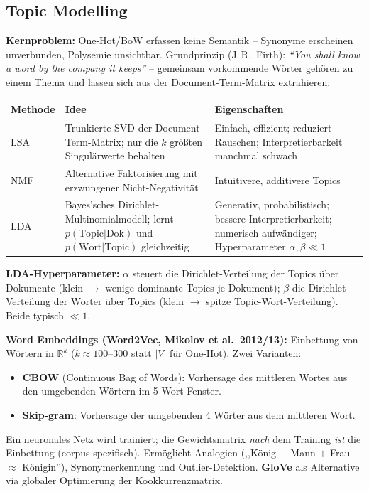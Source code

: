 \newpage
\subsection{Topic Modelling}

\textbf{Kernproblem:} One-Hot/BoW erfassen keine Semantik -- Synonyme erscheinen unverbunden, Polysemie unsichtbar. Grundprinzip (J.\,R.\ Firth): \textit{``You shall know a word by the company it keeps''} -- gemeinsam vorkommende Wörter gehören zu einem Thema und lassen sich aus der Document-Term-Matrix extrahieren.

\begin{table}[H]
\centering
\begin{tabular}{p{2cm} p{6.5cm} p{6.5cm}}
\hline
\textbf{Methode} & \textbf{Idee} & \textbf{Eigenschaften} \\
\hline
LSA & Trunkierte SVD der Document-Term-Matrix; nur die $k$ größten Singulärwerte behalten & Einfach, effizient; reduziert Rauschen; Interpretierbarkeit manchmal schwach \\
NMF & Alternative Faktorisierung mit erzwungener Nicht-Negativität & Intuitivere, additivere Topics \\
LDA & Bayes'sches Dirichlet-Multinomialmodell; lernt $p(\text{Topic}|\text{Dok})$ und $p(\text{Wort}|\text{Topic})$ gleichzeitig & Generativ, probabilistisch; bessere Interpretierbarkeit; numerisch aufwändiger; Hyperparameter $\alpha, \beta \ll 1$ \\
\hline
\end{tabular}
\end{table}

\textbf{LDA-Hyperparameter:} $\alpha$ steuert die Dirichlet-Verteilung der Topics über Dokumente (klein $\to$ wenige dominante Topics je Dokument); $\beta$ die Dirichlet-Verteilung der Wörter über Topics (klein $\to$ spitze Topic-Wort-Verteilung). Beide typisch $\ll 1$.

\textbf{Word Embeddings (Word2Vec, Mikolov et al.\ 2012/13):} Einbettung von Wörtern in $\mathbb{R}^k$ ($k\approx100$--$300$ statt $|V|$ für One-Hot). Zwei Varianten:
\begin{itemize}[leftmargin=1.5em]
    \item \textbf{CBOW} (Continuous Bag of Words): Vorhersage des mittleren Wortes aus den umgebenden Wörtern im 5-Wort-Fenster.
    \item \textbf{Skip-gram}: Vorhersage der umgebenden 4 Wörter aus dem mittleren Wort.
\end{itemize}
Ein neuronales Netz wird trainiert; die Gewichtsmatrix \emph{nach} dem Training \emph{ist} die Einbettung (corpus-spezifisch). Ermöglicht Analogien (,,König $-$ Mann $+$ Frau $\approx$ Königin''), Synonymerkennung und Outlier-Detektion. \textbf{GloVe} als Alternative via globaler Optimierung der Kookkurrenzmatrix.

